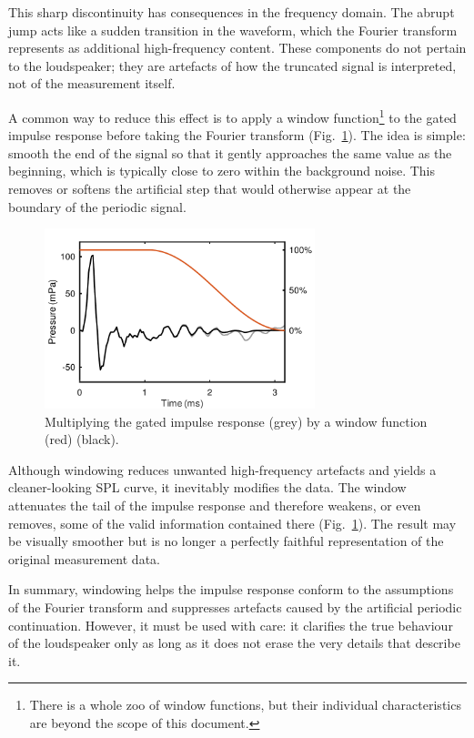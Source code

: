 \documentclass[12pt,a4paper]{article}
\providecommand{\figlabel}[1]{\label{fig:#1}}
\providecommand{\figr}[1]{Fig.~\ref{fig:#1}}
\begin{document}
This sharp discontinuity has consequences in the frequency domain. The abrupt jump acts like a sudden transition in the waveform, which the Fourier transform represents as additional high-frequency content. These components do not pertain to the loudspeaker; they are artefacts of how the truncated signal is interpreted, not of the measurement itself.

A common way to reduce this effect is to apply a window function\footnote{There is a whole zoo of window functions, but their individual characteristics are beyond the scope of this document.} to the gated impulse response before taking the Fourier transform (\figr{FIGURE4}). The idea is simple: smooth the end of the signal so that it gently approaches the same value as the beginning, which is typically close to zero within the background noise. This removes or softens the artificial step that would otherwise appear at the boundary of the periodic signal.

\begin{figure}[tbp]
  \begin{center}
    \includegraphics[width=0.7\textwidth]{FIGURE4}
    \caption{Multiplying the gated impulse response (grey) by a window function (red) (black).}
    \figlabel{FIGURE4}
  \end{center}
\end{figure}

Although windowing reduces unwanted high-frequency artefacts and yields a cleaner-looking SPL curve, it inevitably modifies the data. The window attenuates the tail of the impulse response and therefore weakens, or even removes, some of the valid information contained there (\figr{FIGURE4}). The result may be visually smoother but is no longer a perfectly faithful representation of the original measurement data.

In summary, windowing helps the impulse response conform to the assumptions of the Fourier transform and suppresses artefacts caused by the artificial periodic continuation. However, it must be used with care: it clarifies the true behaviour of the loudspeaker only as long as it does not erase the very details that describe it.
\end{document}
